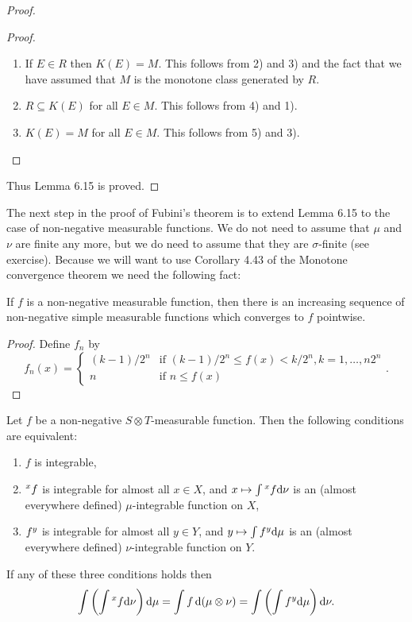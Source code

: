\begin{proof}
\begin{proof}
\begin{enumerate}[label=\arabic*)]
    \item If $E\in R$ then $K(E)=M$. This follows from 2) and 3) and the fact that we have assumed that $M$ is the monotone class generated by $R$.

    \item $R\subseteq K(E)$ for all $E\in M$. This follows from 4) and 1).

    \item $K(E)=M$ for all $E\in M$. This follows from 5) and 3).
\end{enumerate}
\end{proof}
Thus Lemma 6.15 is proved.
\end{proof}

The next step in the proof of Fubini's theorem is to extend Lemma 6.15 to the case of non-negative measurable functions. We do not need to assume that $\mu$ and $\nu$ are finite any more, but we do need to assume that they are $\sigma$-finite (see exercise). Because we will want to use Corollary 4.43 of the Monotone convergence theorem we need the following fact:

\begin{proposition}
If $f$ is a non-negative measurable function, then there is an increasing sequence of non-negative simple measurable functions which converges to $f$ pointwise.
\end{proposition}

\begin{proof}
Define $f_n$ by $$f_n(x)=\begin{cases}(k-1)/2^n&\text{if }(k-1)/2^n\leq f(x)<k/2^n, k=1,\dots,n2^n\\n&\text{if }n\leq f(x)\end{cases}.$$
\end{proof}

\begin{theorem}
Let $f$ be a non-negative $S\otimes T$-measurable function. Then the following conditions are equivalent:
\begin{enumerate}[label=\arabic*)]
    \item $f$ is integrable,

    \item $\xsec{f}{x}$ is integrable for almost all $x\in X$, and $x\mapsto\int\xsec{f}{x}\dd\nu$ is an (almost everywhere defined) $\mu$-integrable function on $X$,

    \item $\ysec{f}{y}$ is integrable for almost all $y\in Y$, and $y\mapsto\int\ysec{f}{y}\dd\mu$ is an (almost everywhere defined) $\nu$-integrable function on $Y$.
\end{enumerate}
If any of these three conditions holds then $$\int\br{\int\xsec{f}{x}\dd\nu}\dd\mu=\int f\dd(\mu\otimes\nu)=\int\br{\int\ysec{f}{y}\dd\mu}\dd\nu.$$
\end{theorem}


